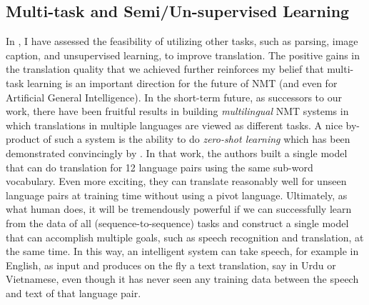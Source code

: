 \subsection{Multi-task and Semi/Un-supervised Learning}
In , I have assessed the feasibility of utilizing other tasks, such as parsing, image caption, and unsupervised learning, to improve translation. The positive gains in the translation quality that we achieved further reinforces my belief that multi-task learning is an important direction for the future of NMT (and even for Artificial General Intelligence). In the short-term future, as successors to our work, there have been fruitful results in building {\it multilingual} NMT systems \cite{zoph16,firat16,gnmt16multi,ha16} in which translations in multiple languages are viewed as different tasks. A nice by-product of such a system is the ability to do {\it zero-shot learning} which has been demonstrated convincingly by . In that work, the authors built a single model that can do translation for 12 language pairs using the same sub-word vocabulary. Even more exciting, they can translate reasonably well for unseen language pairs at training time without using a pivot language. Ultimately, as what human does, it will be tremendously powerful if we can successfully learn from the data of all (sequence-to-sequence) tasks and construct a single model that can accomplish multiple goals, such as speech recognition and translation, at the same time. In this way, an intelligent system can take speech, for example in English, as input and produces on the fly a text translation, say in Urdu or Vietnamese, even though it has never seen any training data between the speech and text of that language pair.

